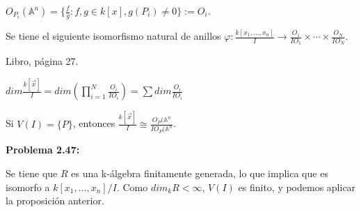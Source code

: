 $O_{P_i}(\mathbb{A}^n)=\{ \frac{f}{g}: f,g \in k[x], g(P_i)\neq 0 \}:= O_i$.

\begin{Prop}
Se tiene el siguiente isomorfismo natural de anillos $\varphi: \frac{k[x_1,\dots,x_n]}{I}\rightarrow \frac{O_1}{IO_1}\times \cdots \times \frac{O_N}{IO_N}$. 
\end{Prop}

\begin{Dem}
Libro, página 27.
\end{Dem}


\begin{Cor}
$dim \frac{k[\vec{x}]}{I} = dim (\prod_{i=1}^N \frac{O_i}{IO_i}) = \sum dim \frac{O_i}{IO_i}$
\end{Cor}

\begin{Cor}
Si $V(I)=\{ P \}$, entonces $\frac{k[\vec{x}]}{I} \cong \frac{O_P(\mathbb{A}^n}{IO_P(\mathbb{A}^n}$.
\end{Cor}

\textbf{Problema 2.47: }

Se tiene que $R$ es una k-álgebra finitamente generada, lo que implica que es isomorfo a $k[x_1,\dots,x_n]/I$. Como $dim_kR <\infty $, $V(I)$ es finito, y podemos aplicar la proposición anterior. 